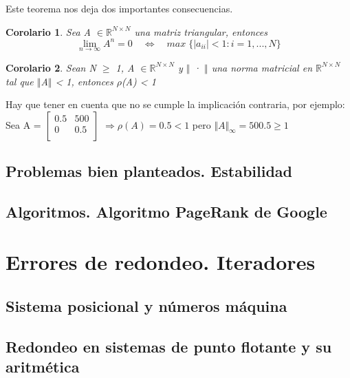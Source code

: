 \documentclass[10pt, a4paper]{article}
\makeatletter
\renewenvironment{proof}[1][\proofname] {\par\pushQED{\qed}\normalfont\topsep6\p@\@plus6\p@\relax\trivlist\item[\hskip\labelsep\itshape\sffamily#1\@addpunct{.}]\ignorespaces}{\popQED\endtrivlist\@endpefalse}
\theoremstyle{theorem-style}
\newtheorem{ncor}{Corolario}[section]
\theoremstyle{definition-style}
\theoremstyle{remark-style}
\theoremstyle{example-style}
\theoremstyle{definition-style}
\theoremstyle{remark-style}
\makeatother
\begin{document}
Este teorema nos deja dos importantes consecuencias.

\begin{ncor}
Sea A $\in \mathbb{R}^{N \times N}$ una matriz triangular, entonces
\[ \lim_{n \rightarrow \infty} A^n = 0 \quad \Leftrightarrow \quad max \; \lbrace \vert a_{ii} \vert < 1 : i = 1,...,N \rbrace \]
\end{ncor}

\begin{proof}
\end{proof}

\begin{ncor}
Sean N $\geq$ 1, A $\in \mathbb{R}^{N \times N}$ y $\Vert$ · $\Vert$ una norma matricial en $\mathbb{R}^{N \times N}$ tal que $\Vert$A$\Vert$ < 1, entonces $\rho$(A) < 1
\end{ncor}

Hay que tener en cuenta que no se cumple la implicación contraria, por ejemplo:\\
Sea A = $\begin{bmatrix}
0.5 & 500 \\
0 & 0.5 \\
\end{bmatrix}$ $\Rightarrow \rho (A) = 0.5 < 1$ pero $\Vert A \Vert _\infty = 500.5 \geq 1$


\subsection{Problemas bien planteados. Estabilidad}


\subsection{Algoritmos. Algoritmo PageRank de Google}


\section{Errores de redondeo. Iteradores}


\subsection{Sistema posicional y números máquina}


\subsection{Redondeo en sistemas de punto flotante y su aritmética}
\end{document}
